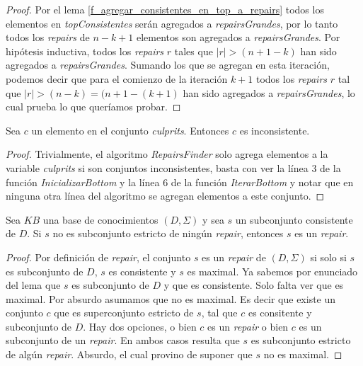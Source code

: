 \documentclass[11pt,a4paper,twoside]{tesis}
\begin{document}
\begin{proof}
Por el lema \ref{f_agregar_consistentes_en_top_a_repairs} todos los elementos en \textit{topConsistentes} serán agregados a \textit{repairsGrandes}, por lo tanto todos los \textit{repairs} de $n-k+1$ elementos son agregados a \textit{repairsGrandes}.
Por hipótesis inductiva, todos los \textit{repairs} $r$ tales que $|r| > (n + 1 - k)$ han sido agregados a \textit{repairsGrandes}. Sumando los que se agregan en esta iteración, podemos decir que para el comienzo de la iteración $k+1$ todos los \textit{repairs} $r$ tal que $|r| > (n - k) = (n + 1 - (k + 1)$ han sido agregados a \textit{repairsGrandes}, lo cual prueba lo que queríamos probar.



\end{proof}

\begin{lemma}\label{culprits_inconsistentes}
Sea $c$ un elemento en el conjunto \textit{culprits}. Entonces $c$ es inconsistente.
\end{lemma}

\begin{proof}
Trivialmente, el algoritmo \textit{RepairsFinder} solo agrega elementos a la variable \textit{culprits} si son conjuntos inconsistentes, basta con ver la línea 3 de la función \textit{InicializarBottom} y la línea 6 de la función \textit{IterarBottom} y notar que en ninguna otra línea del algoritmo se agregan elementos a este conjunto.
\end{proof}


\begin{lemma}\label{s_es_un_repair}
Sea $KB$ una base de conocimientos $(D, \Sigma)$ y sea $s$ un subconjunto consistente de $D$. Si $s$ no es subconjunto estricto de ningún \textit{repair}, entonces $s$ es un \textit{repair}.
\end{lemma}

\begin{proof}
Por definición de \textit{repair}, el conjunto $s$ es un \textit{repair} de $(D, \Sigma)$ si solo si $s$ es subconjunto de $D$, $s$ es consistente y $s$ es maximal. Ya sabemos por enunciado del lema que $s$ es subconjunto de $D$ y que es consistente. Solo falta ver que es maximal. Por absurdo asumamos que no es maximal. Es decir que existe un conjunto $c$ que es superconjunto estricto de $s$, tal que $c$ es consitente y subconjunto de $D$. Hay dos opciones, o bien $c$ es un \textit{repair} o bien $c$ es un subconjunto de un \textit{repair}. En ambos casos resulta que $s$ es subconjunto estricto de algún \textit{repair}. Absurdo, el cual provino de suponer que $s$ no es maximal.
\end{proof}
\end{document}
